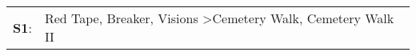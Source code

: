 \begin{supertabular}{p{0.03\textwidth}p{0.92\textwidth}}
 \textbf{S1}:  &  Red Tape\textsuperscript{}, \enspace Breaker\textsuperscript{}, \enspace Visions\textsuperscript{} \textgreater \enspace Cemetery Walk\textsuperscript{}, \enspace Cemetery Walk II\textsuperscript{}  \enspace  \\
\end{supertabular}
